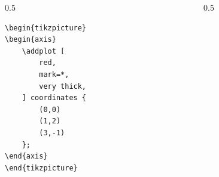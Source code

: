\documentclass[12pt,aspectratio=169,ignorenonframetext]{ltxbeamer}
\begin{document}
\begin{frame}[fragile]
\begin{columns}
    \begin{column}{0.5\textwidth}
        \begin{verbatim}
\begin{tikzpicture}
\begin{axis}
    \addplot [
        red,
        mark=*,
        very thick,
    ] coordinates {
        (0,0)
        (1,2)
        (3,-1)
    };
\end{axis}
\end{tikzpicture}
        \end{verbatim}
    \end{column}
    {\color{gray} \vline}
    \begin{column}{0.5\textwidth}
    \end{column}
\end{columns}
\end{frame}
\end{document}
